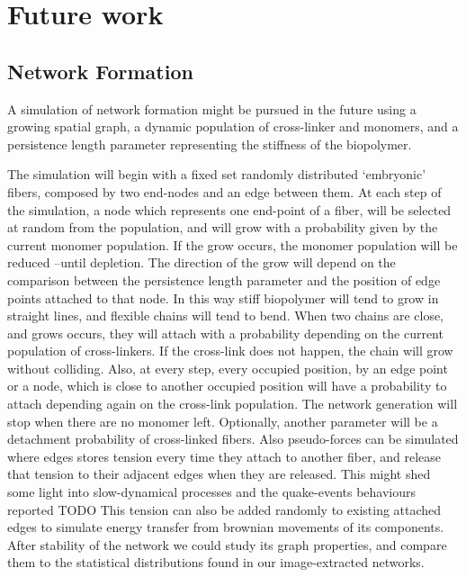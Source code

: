 \section{Future work}%
\label{sec:future_work}

\subsection{Network Formation}%
\label{sub:network_formation}

A simulation of network formation might be pursued in the future
  using a growing spatial graph, a dynamic population of cross-linker and monomers, and a persistence length parameter representing the stiffness of the biopolymer.

  The simulation will begin with a fixed set randomly distributed `embryonic' fibers, composed by two end-nodes and an edge between them. At each step of the simulation, a node which represents one end-point of a fiber, will be selected at random from the population, and will grow with a probability given by the current monomer population. If the grow occurs, the monomer population will be reduced --until depletion. The direction of the grow will depend on the comparison between the persistence length parameter and the position of edge points attached to that node. In this way stiff biopolymer will tend to grow in straight lines, and flexible chains will tend to bend.
  When two chains are close, and grows occurs, they will attach with a probability depending on the current population of cross-linkers. If the cross-link does not happen, the chain will grow without colliding. Also, at every step, every occupied position, by an edge point or a node, which is close to another occupied position will have a probability to attach depending again on the cross-link population. The network generation will stop when there are no monomer left. Optionally, another parameter will be a detachment probability of cross-linked fibers. Also pseudo-forces can be simulated where edges stores tension every time they attach to another fiber, and release that tension to their adjacent edges when they are released. This might shed some light into slow-dynamical processes and the quake-events behaviours reported TODO  This tension can also be added randomly to existing attached edges to simulate energy transfer from brownian movements of its components. After stability of the network we could study its graph properties, and compare them to the statistical distributions found in our image-extracted networks.

